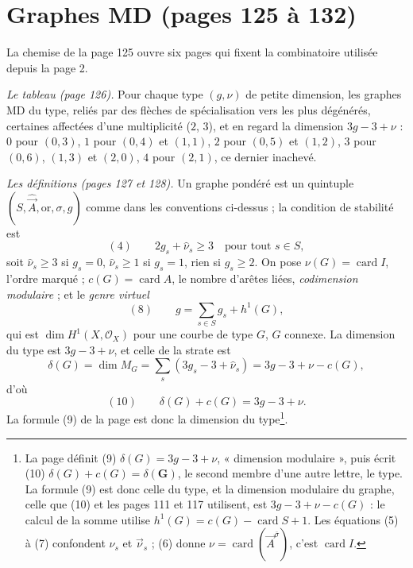 \documentclass[11pt,a4paper]{article}
\begin{document}
\section*{Graphes MD (pages 125 à 132)}

La chemise de la page 125 ouvre six pages qui fixent la combinatoire utilisée
depuis la page 2.

\emph{Le tableau (page 126).} Pour chaque type $(g, \nu)$ de petite
dimension, les graphes MD du type, reliés par des flèches de spécialisation
vers les plus dégénérés, certaines affectées d'une multiplicité ($2$, $3$), et
en regard la dimension $3g - 3 + \nu$ : $0$ pour $(0,3)$, $1$ pour $(0,4)$ et
$(1,1)$, $2$ pour $(0,5)$ et $(1,2)$, $3$ pour $(0,6)$, $(1,3)$ et $(2,0)$, $4$
pour $(2,1)$, ce dernier inachevé.

\emph{Les définitions (pages 127 et 128).} Un graphe pondéré est un quintuple
$(S, \hat{\vec A}, \mathrm{or}, \sigma, g)$ comme dans les conventions ci-dessus ;
la condition de stabilité est
\[
(4)\qquad 2g_s + \hat\nu_s \geq 3 \quad \text{pour tout } s \in S,
\]
soit $\hat\nu_s \geq 3$ si $g_s = 0$, $\hat\nu_s \geq 1$ si $g_s = 1$, rien
si $g_s \geq 2$. On pose $\nu(G) = \operatorname{card} I$, l'ordre marqué ;
$c(G) = \operatorname{card} A$, le nombre d'arêtes liées, \emph{codimension
modulaire} ; et le \emph{genre virtuel}
\[
(8)\qquad g = \sum_{s \in S} g_s + h^1(G),
\]
qui est $\dim H^1(X, \mathcal{O}_X)$ pour une courbe de type $G$, $G$ connexe.
La dimension du type est $3g - 3 + \nu$, et celle de la strate est
\[
\delta(G) = \dim M_G = \sum_{s} (3g_s - 3 + \hat\nu_s) = 3g - 3 + \nu - c(G),
\]
d'où
\[
(10)\qquad \delta(G) + c(G) = 3g - 3 + \nu .
\]
La formule (9) de la page est donc la dimension du type\footnote{La page définit (9)
$\delta(G) = 3g - 3 + \nu$, « dimension modulaire », puis écrit (10) $\delta(G)
+ c(G) = \delta(\mathbf{G})$, le second membre d'une autre lettre, le type. La
formule (9) est donc celle du type, et la dimension modulaire du graphe, celle
que (10) et les pages 111 et 117 utilisent, est $3g - 3 + \nu - c(G)$ : le
calcul de la somme utilise $h^1(G) = c(G) - \operatorname{card} S + 1$. Les
équations (5) à (7) confondent $\nu_s$ et $\vec\nu_s$ ; (6) donne $\nu =
\operatorname{card}(\vec A^{\bar\sigma})$, c'est $\operatorname{card} I$.}.
\end{document}
